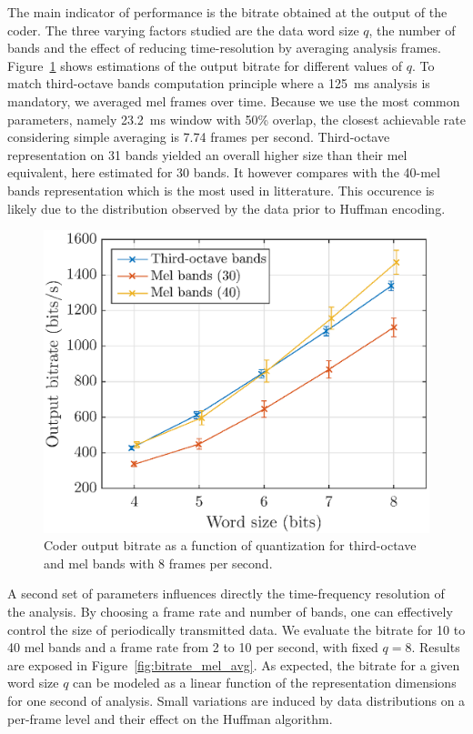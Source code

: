 \documentclass[final,3p,times,twocolumn]{elsarticle}
\begin{document}
The main indicator of performance is the bitrate obtained at the output of the coder. The three varying factors studied are the data word size $q$, the number of bands and the effect of reducing time-resolution by averaging analysis frames. Figure~\ref{fig:bitrate_q} shows estimations of the output bitrate for different values of $q$. To match third-octave bands computation principle where a 125~ms analysis is mandatory, we averaged mel frames over time. Because we use the most common parameters, namely 23.2~ms window with 50\% overlap, the closest achievable rate considering simple averaging is 7.74 frames per second. Third-octave representation on 31 bands yielded an overall higher size than their mel equivalent, here estimated for 30 bands. It however compares with the 40-mel bands representation which is the most used in litterature. This occurence is likely due to the distribution observed by the data prior to Huffman encoding.

\begin{figure}[htbp]
	\centering
		\includegraphics[width=\columnwidth]{figures/bitrate_qall.eps}
	\caption{Coder output bitrate as a function of quantization for third-octave and mel bands with 8 frames per second.}
	\label{fig:bitrate_q}
\end{figure}

A second set of parameters influences directly the time-frequency resolution of the analysis. By choosing a frame rate and number of bands, one can effectively control the size of periodically transmitted data. We evaluate the bitrate for 10 to 40 mel bands and a frame rate from 2 to 10 per second, with fixed $q = 8$. Results are exposed in Figure~\ref{fig:bitrate_mel_avg}. As expected, the bitrate for a given word size $q$ can be modeled as a linear function of the representation dimensions for one second of analysis. Small variations are induced by data distributions on a per-frame level and their effect on the Huffman algorithm.
\end{document}
